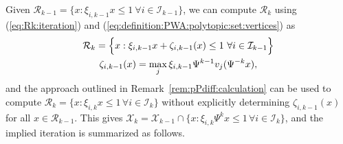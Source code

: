 \documentclass[journal]{IEEEtran}
\theoremstyle{remark}
\theoremstyle{definition}
\begin{document}
Given $\mathcal{R}_{k-1} = \{ x : \xi_{i,k-1} x \leq 1 \ \forall i \in \mathcal{I}_{k-1}\}$, we can compute $\mathcal{R}_k$ using (\ref{eq:Rk:iteration}) and (\ref{eq:definition:PWA:polytopic:set:vertices}) as
\begin{subequations}\label{eq:Rk:explicit}
\begin{gather}
\mathcal{R}_k = \Bigl\{ x : \xi_{i,k-1} x + \zeta_{i,k-1}(x) \leq 1 \ \forall i \in \mathcal{I}_{k-1} \Bigr\} \\
\zeta_{i,k-1}(x) = \max_{j} \xi_{i,k-1} \Psi^{k-1} v_j(\Psi^{-k}x) ,
\end{gather}
\end{subequations}
and the approach outlined in Remark~\ref{rem:pPdiff:calculation} can be used to compute $\mathcal{R}_k = \{x: \xi_{i,k} x \leq 1\, \forall i \in \mathcal{I}_k\}$ without explicitly determining $\zeta_{i,k-1}(x)$ for all $x\in\mathcal{R}_{k-1}$. This gives $\mathcal{X}_k = \mathcal{X}_{k-1}\cap \{x: \xi_{i,k}\Psi^k x \leq 1\, \forall i \in \mathcal{I}_k\}$,%
%
%
and the implied iteration is summarized as follows.
%
\end{document}
